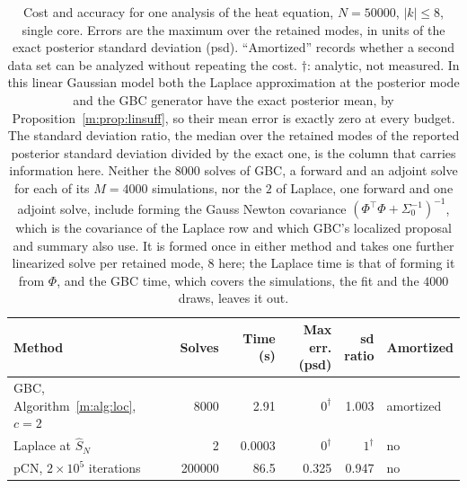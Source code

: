 \begin{table}[t]\centering\footnotesize\setlength{\tabcolsep}{4pt}
\caption{Cost and accuracy for one analysis of the heat equation, $N=50000$, $|k|\le8$, single core. Errors are the maximum over the retained modes, in units of the exact posterior standard deviation (psd). ``Amortized'' records whether a second data set can be analyzed without repeating the cost. $\dagger$: analytic, not measured. In this linear Gaussian model both the Laplace approximation at the posterior mode and the GBC generator have the exact posterior mean, by Proposition~\ref{m:prop:linsuff}, so their mean error is exactly zero at every budget. The standard deviation ratio, the median over the retained modes of the reported posterior standard deviation divided by the exact one, is the column that carries information here. Neither the $8000$ solves of GBC, a forward and an adjoint solve for each of its $M=4000$ simulations, nor the $2$ of Laplace, one forward and one adjoint solve, include forming the Gauss Newton covariance $(\Phi^\top\Phi+\Sigma_0^{-1})^{-1}$, which is the covariance of the Laplace row and which GBC's localized proposal and summary also use. It is formed once in either method and takes one further linearized solve per retained mode, $8$ here; the Laplace time is that of forming it from $\Phi$, and the GBC time, which covers the simulations, the fit and the $4000$ draws, leaves it out.}\label{m:tab:cost}
\begin{tabular}{lrrrrl}
\toprule
Method & Solves & Time (s) & \shortstack[r]{Max err.\\(psd)} & \shortstack[r]{sd\\ratio} & Amortized\\
\midrule
GBC, Algorithm~\ref{m:alg:loc}, $c=2$ & 8000 & 2.91 & $0^{\dagger}$ & 1.003 & amortized \\
Laplace at $\hat S_N$ & 2 & 0.0003 & $0^{\dagger}$ & $1^{\dagger}$ & no \\
pCN, $2\times10^{5}$ iterations & 200000 & 86.5 & 0.325 & 0.947 & no \\
\bottomrule
\end{tabular}
\end{table}

